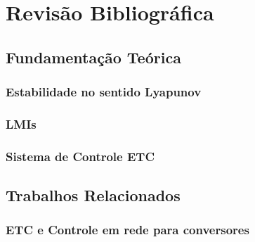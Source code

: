 \chapter{Revisão Bibliográfica} \label{cap2}
\section{Fundamentação Teórica}

\subsection{Estabilidade no sentido Lyapunov}
\subsection{LMIs}
\subsection{Sistema de Controle ETC}

\section{Trabalhos Relacionados}
\subsection{ETC e Controle em rede para conversores}
 
 
 
 
 
 
 
 
 
 
 